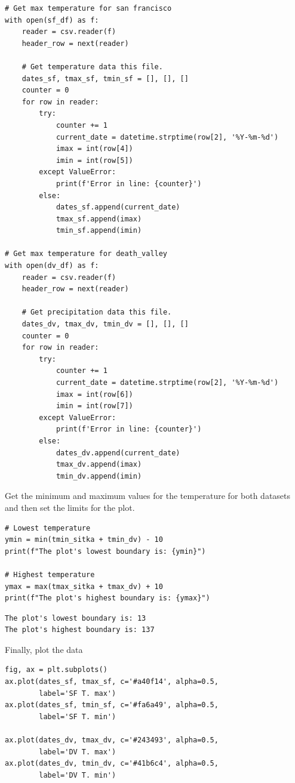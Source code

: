 \documentclass[10pt]{book}
\begin{document}
\begin{enumerate}
\begin{verbatim}
# Get max temperature for san francisco
with open(sf_df) as f:
    reader = csv.reader(f)
    header_row = next(reader)

    # Get temperature data this file.
    dates_sf, tmax_sf, tmin_sf = [], [], []
    counter = 0
    for row in reader:
        try:
            counter += 1
            current_date = datetime.strptime(row[2], '%Y-%m-%d')
            imax = int(row[4])
            imin = int(row[5])
        except ValueError:
            print(f'Error in line: {counter}')
        else:
            dates_sf.append(current_date)
            tmax_sf.append(imax)
            tmin_sf.append(imin)

# Get max temperature for death_valley
with open(dv_df) as f:
    reader = csv.reader(f)
    header_row = next(reader)

    # Get precipitation data this file.
    dates_dv, tmax_dv, tmin_dv = [], [], []
    counter = 0
    for row in reader:
        try:
            counter += 1
            current_date = datetime.strptime(row[2], '%Y-%m-%d')
            imax = int(row[6])
            imin = int(row[7])
        except ValueError:
            print(f'Error in line: {counter}')
        else:
            dates_dv.append(current_date)
            tmax_dv.append(imax)
            tmin_dv.append(imin)
\end{verbatim}

Get the minimum and maximum values for the temperature for both datasets and then set the limits for the plot.

\begin{verbatim}
# Lowest temperature
ymin = min(tmin_sitka + tmin_dv) - 10
print(f"The plot's lowest boundary is: {ymin}")

# Highest temperature
ymax = max(tmax_sitka + tmax_dv) + 10
print(f"The plot's highest boundary is: {ymax}")
\end{verbatim}
\label{orga737fe0}
\begin{verbatim}
The plot's lowest boundary is: 13
The plot's highest boundary is: 137
\end{verbatim}

Finally, plot the data
\begin{verbatim}
fig, ax = plt.subplots()
ax.plot(dates_sf, tmax_sf, c='#a40f14', alpha=0.5,
        label='SF T. max')
ax.plot(dates_sf, tmin_sf, c='#fa6a49', alpha=0.5,
        label='SF T. min')

ax.plot(dates_dv, tmax_dv, c='#243493', alpha=0.5,
        label='DV T. max')
ax.plot(dates_dv, tmin_dv, c='#41b6c4', alpha=0.5,
        label='DV T. min')


\end{verbatim}
\end{enumerate}
\end{document}
